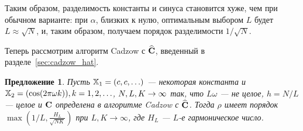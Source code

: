 \documentclass[12pt,a4paper,fleqn,leqno]{article}
\newtheorem{proposition}{Предложение}%
\begin{document}
Таким образом, разделимость константы и синуса становится хуже, чем при обычном варианте: при $\alpha$, близких к нулю, оптимальным выбором $L$ будет $L \approx \sqrt{N}$, и, таким образом, получаем порядок разделимости $1/\sqrt{N}$.

Теперь рассмотрим алгоритм Cadzow с $\widehat{\mathbf{C}}$, введенный в разделе~\ref{sec:cadzow_hat}.

\begin{proposition}
Пусть $\mathbb{X}_1 = (c, c, \ldots)$ --- некоторая константа и $\mathbb{X}_2 = (\cos(2 \pi \omega k)), k = 1, 2, \ldots$, $N,L,K\rightarrow \infty$ так, что $L\omega$ --- не целое, $h = N/L$ --- целое и $\mathbf{C}$ определена в алгоритме Cadzow с $\widehat{\mathbf{C}}$.
 Тогда $\rho$ имеет порядок $\max \left(1/L, \frac{H_L}{\sqrt{NK}} \right)$ при $L, K \to \infty$, где $H_L$ --- $L$-е гармоническое число.
\end{proposition}
\end{document}
